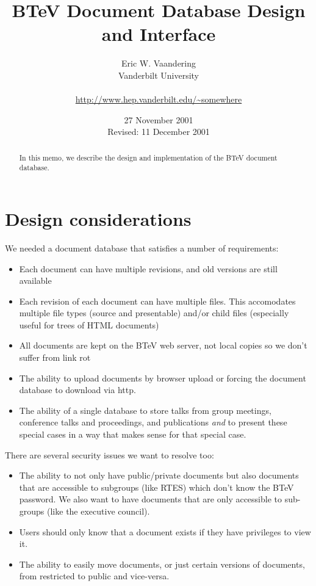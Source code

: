 \documentclass[12pt]{article}
\begin{document}
                                                 

\title{BTeV Document Database Design and Interface}

\author{
        Eric W. Vaandering\\  
        Vanderbilt University\\
        \\
        {\small\url{http://www.hep.vanderbilt.edu/~somewhere}}
       }
        

\date{27 November 2001 \\
      Revised: 11 December 2001}

\maketitle

\begin{abstract} 
In this memo, we describe the design and implementation of the BTeV document
database.
\end{abstract}

\section{Design considerations}

We needed a document database that satisfies a number of requirements:
\begin{itemize}
\item{Each document can have multiple revisions, and old versions are still
available}
\item{Each revision of each document can have multiple files. This accomodates
multiple file types (source and  presentable) and/or child files (especially
useful for trees of HTML  documents)}
\item{All documents are kept on the BTeV web server, not local copies 
so we don't suffer from link rot}
\item{The ability to upload documents by browser upload or forcing the 
document database to download via http.}
\item{The ability of a single database to store talks from group meetings,
conference talks and proceedings, and publications \emph{and} to present these
special cases in a way that makes sense for that special case.}
\end{itemize}

There are several security issues we want to resolve too:
\begin{itemize}
\item{The ability to not only have public/private documents but also 
documents that are accessible to subgroups (like RTES) which don't know 
the BTeV password. We also want to have documents that are only 
accessible to sub-groups (like the executive council).}
\item{Users should only know that a document exists if they have 
privileges to view it.}
\item{The ability to easily move documents, or just certain versions of 
documents, from restricted to public and vice-versa.}
\end{itemize}
\end{document}
